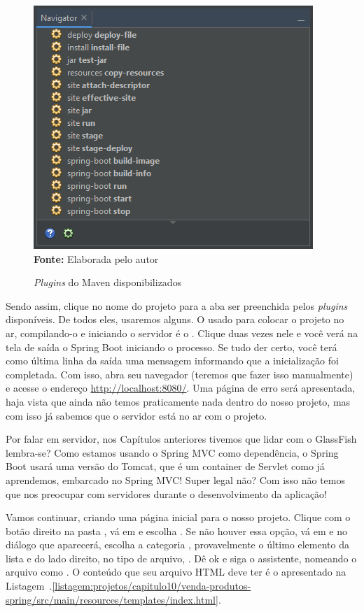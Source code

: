 \FloatBarrier
\begin{figure}[!htbp]
    \centering
    \caption{\textit{Plugins} do Maven disponibilizados}
    \includegraphics[scale=1]{imagens/cap10PluginsMaven}
    \\\textbf{Fonte:} Elaborada pelo autor
    \label{fig:cap10PluginsMaven}
\end{figure}
\FloatBarrier

Sendo assim, clique no nome do projeto para a aba  ser preenchida pelos \textit{plugins} disponíveis. De todos eles, usaremos alguns. O usado para colocar o projeto no ar, compilando-o e iniciando o servidor é o . Clique duas vezes nele e você verá na tela de saída o Spring Boot iniciando o processo. Se tudo der certo, você terá como última linha da saída uma mensagem informando que a inicialização foi completada. Com isso, abra seu navegador (teremos que fazer isso manualmente) e acesse o endereço \url{http://localhost:8080/}. Uma página de erro será apresentada, haja vista que ainda não temos praticamente nada dentro do nosso projeto, mas com isso já sabemos que o servidor está no ar com o projeto.

Por falar em servidor, nos Capítulos anteriores tivemos que lidar com o GlassFish lembra-se? Como estamos usando o Spring MVC como dependência, o Spring Boot usará uma versão do Tomcat, que é um container de Servlet como já aprendemos, embarcado no Spring MVC! Super legal não? Com isso não temos que nos preocupar com servidores durante o desenvolvimento da aplicação!

Vamos continuar, criando uma página inicial para o nosso projeto. Clique com o botão direito na pasta , vá em  e escolha . Se não houver essa opção, vá em  e no diálogo que aparecerá, escolha a categoria , provavelmente o último elemento da lista e do lado direito, no tipo de arquivo, . Dê ok e siga o assistente, nomeando o arquivo como . O conteúdo que seu arquivo HTML deve ter é o apresentado na Listagem~\thechapter.\ref{listagem:projetos/capitulo10/venda-produtos-spring/src/main/resources/templates/index.html}.

